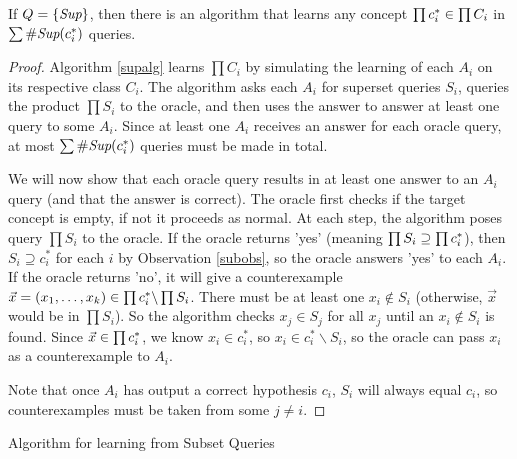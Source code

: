 \begin{proposition}

If $Q = \{ \supQ \}$, then there is an algorithm that learns any concept $\targ \in \prod C_i $ in $\sum \supCi{i}(c^*_i)$ queries.  
\end{proposition}
\begin{proof}
Algorithm \ref{supalg} learns $\prod C_i $ by simulating the learning of each $A_i$ on its respective class $C_i$. 
The algorithm asks each $A_i$ for superset queries $S_i$, queries the product $\prod S_i$ to the oracle, and then uses the answer to answer at least one query to some $A_i$. 
Since at least one $A_i$ receives an answer for each oracle query, at most $\sum \supCi{i}(c^*_i)$ queries must be made in total. 

 

We will now show that each oracle query results in at least one answer to an $A_i$ query (and that the answer is correct). 
The oracle first checks if the target concept is empty, if not it proceeds as normal.
At each step, the algorithm poses query $\prod S_i$ to the oracle. 
If the oracle returns 'yes' (meaning $\prod S_i \supseteq \targ$), then  $S_i \supseteq c_i^*$ for each $i$ by Observation \ref{subobs}, so the oracle answers 'yes' to each $A_i$. 
If the oracle returns 'no', it will give a counterexample $\vec{x} = (x_1,\dots,x_k) \in \targ \backslash \prod S_i$. 
There must be at least one $x_i \not\in S_i$ (otherwise, $\vec{x}$ would be in $\prod S_i$). 
So the algorithm checks $x_j \in S_j$ for all $x_j$ until an $x_i \not\in S_i$ is found. 
Since $\vec{x} \in \targ$, we know $x_i \in c_i^*$, so $x_i \in c_i^* \backslash S_i$, so the oracle can pass $x_i$ as a counterexample to $A_i$. 

Note that once $A_i$ has output a correct hypothesis $c_i$, $S_i$ will always equal $c_i$, so counterexamples must be taken from some $j \ne i$. 
\end{proof}





\begin{algorithm}[H]
\label{supalg}
\SetAlgoLined
{}
 \;
 \caption{Algorithm for learning from Subset Queries}
\end{algorithm}
